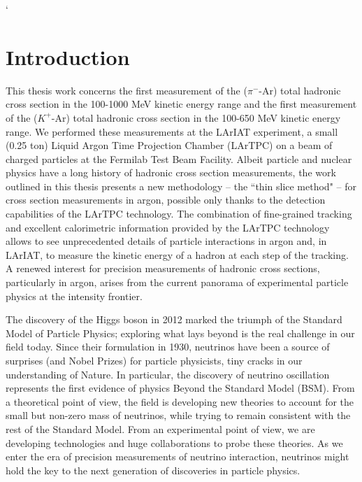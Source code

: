 `\chapter{Introduction}\label{ch:-1}

This thesis work concerns the first measurement of the  ($\pi^-$-Ar)  total hadronic cross section  in the 100-1000 MeV  kinetic energy range and the first measurement of the ($K^+$-Ar) total hadronic cross section  in the 100-650 MeV  kinetic energy range. We performed these measurements at the LArIAT experiment,  a small (0.25 ton)  Liquid Argon Time Projection Chamber (LArTPC) on a beam of charged particles at the Fermilab Test Beam Facility.  Albeit particle and nuclear physics have a long history of hadronic cross section measurements, the work outlined in this thesis presents a new methodology -- the ``thin slice method" -- for cross section measurements in argon, possible only thanks to the detection capabilities of the LArTPC technology. The combination of fine-grained tracking and excellent calorimetric information provided by the LArTPC technology  allows to see unprecedented details of particle interactions in argon and, in LArIAT, to measure the kinetic energy of a hadron at each step of the tracking. A renewed interest for precision measurements of hadronic cross sections, particularly in argon, arises from the current  panorama of experimental  particle physics at the intensity frontier.

The discovery of the Higgs boson in 2012 marked the triumph of the Standard Model of Particle Physics; exploring what lays beyond is the real challenge in our field today. 
Since their formulation in 1930, neutrinos have been a source of surprises (and Nobel Prizes) for particle physicists, tiny cracks in our understanding of Nature. In particular, the discovery of neutrino oscillation represents the first evidence of physics Beyond the Standard Model (BSM).  From a theoretical point of view, the field is developing new theories to account for the small but non-zero mass of neutrinos, while trying to remain consistent with the rest of the Standard Model.  From an experimental point of view, we are developing technologies and huge collaborations to probe these theories. As we enter the era of precision measurements of neutrino interaction, neutrinos might hold the key to the next generation of discoveries in particle physics.

